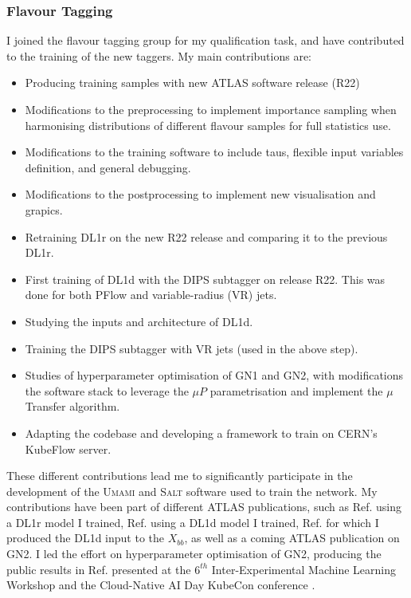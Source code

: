 \subsubsection{Flavour Tagging}
I joined the flavour tagging group for my qualification task, and have contributed to the training of the new taggers. My main contributions are:
\begin{itemize}
    \item Producing training samples with new ATLAS software release (R22)
    \item Modifications to the preprocessing to implement importance sampling when harmonising distributions of different flavour samples for full statistics use.
    \item Modifications to the training software to include taus, flexible input variables definition, and general debugging.
    \item Modifications to the postprocessing to implement new visualisation and grapics. 
    \item Retraining DL1r on the new R22 release and comparing it to the previous DL1r. 
    \item First training of DL1d with the DIPS subtagger on release R22. This was done for both PFlow and variable-radius (VR) jets.
    \item Studying the inputs and architecture of DL1d. 
    \item Training the DIPS subtagger with VR jets (used in the above step).
    \item Studies of hyperparameter optimisation of GN1 and GN2, with modifications the software stack to leverage the $\mu P$ parametrisation and implement the $\mu$Transfer algorithm.
    \item Adapting the codebase and developing a framework to train on CERN's KubeFlow server. 
\end{itemize}
These different contributions lead me to significantly participate in the development of the \textsc{Umami} \cite{UmamiCite} and \textsc{Salt} \cite{SaltCite} software used to train the network. My contributions have been part of different ATLAS publications, such as Ref. \cite{ATL-PHYS-PUB-2022-027} using a DL1r model I trained, Ref. \cite{ATL-PLOT-FTAG-2023-01} using a DL1d model I trained, Ref. \cite{ATL-PHYS-PUB-2023-021} for which I produced the DL1d input to the $X_{bb}$, as well as a coming ATLAS publication on GN2. I led the effort on hyperparameter optimisation of GN2, producing the public results in Ref. \cite{publicplotMUP} presented at the $6^{th}$ Inter-Experimental Machine Learning Workshop \cite{IMLTalk} and the Cloud-Native AI Day KubeCon conference \cite{KubeconTalk}.

